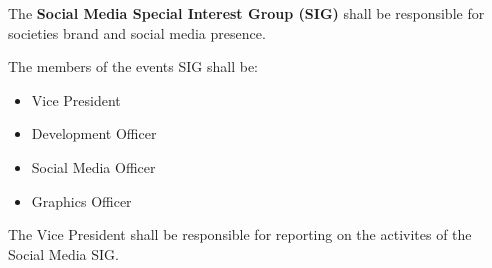\begin{clause}
    The \textbf{Social Media Special Interest Group (SIG)} shall be responsible for societies brand and social media presence.
\end{clause}

\begin{subclause}
    The members of the events SIG shall be:
    \begin{itemize}[label=--,topsep=0em,itemsep=0em]
        \item Vice President
        \item Development Officer
        \item Social Media Officer
        \item Graphics Officer
    \end{itemize}
\end{subclause}

\begin{subclause}
    The Vice President shall be responsible for reporting on the activites of the Social Media SIG.
\end{subclause}